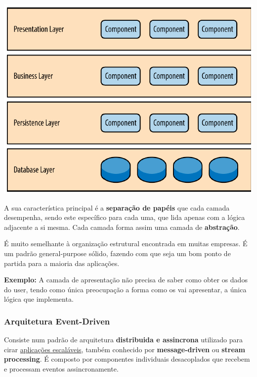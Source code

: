 \documentclass{article}
\begin{document}
\begin{center}
  \includegraphics[scale=0.55]{61}
\end{center}

A sua característica principal é a \textbf{separação de papéis} que cada camada
desempenha, sendo este específico para cada uma, que lida apenas com a lógica adjacente a si mesma.
Cada camada forma assim uma camada de \textbf{abstração}.

É muito semelhante à organização estrutural encontrada em muitas
empresas. É um padrão general-purpose sólido, fazendo com que seja
um bom ponto de partida para a maioria das aplicações.

\vspace{2mm}

\begin{flushleft}
  \textbf{Exemplo:} A camada de apresentação não precisa de saber como obter
  os dados do user, tendo como única preocupação a forma como os vai apresentar,
  a única lógica que implementa.
\end{flushleft}

\pagebreak

\subsubsection{Arquitetura Event-Driven}

Consiste num padrão de arquitetura \textbf{distribuida e assincrona}
utilizado para cirar \uline{aplicações escaláveis}, também conhecido por
\textbf{message-driven} ou \textbf{stream processing}. É composto por
componentes individuais desacoplados que recebem e processam eventos
assincronamente.
\end{document}
